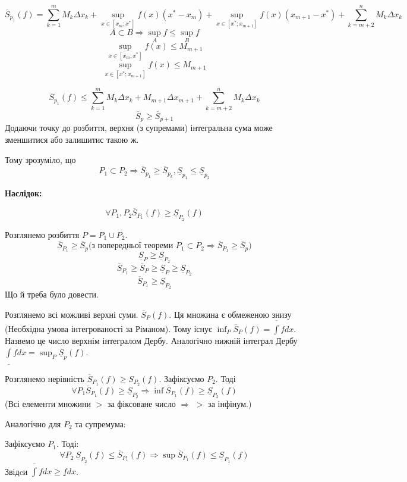 \documentclass[12pt]{report}
\begin{document}
$$\overline S_{p_1}(f) = \sum_{k = 1}^m M_{k} \Delta x_k + \sup_{x \in [x_{m}; x^{*}]} f(x) (x^* - x_m) + \sup_{x \in [x^{*}; x_{m+1}]} f(x) (x_{m+1} - x^*) + \sum_{k = m+2}^n M_k \Delta x_k$$
$$A \subset B \Longrightarrow \sup_{A} f \leq \sup_{B} f$$
$$\sup_{x \in [x_{m}; x^{*}]} f(x) \leq M_{m+1}$$
$$\sup_{x \in [x^{*}; x_{m+1}]} f(x) \leq M_{m+1}$$

$$\overline S_{p_1}(f) \leq \sum_{k = 1}^m M_{k} \Delta x_k + M_{m+1}\Delta x_{m+1} + \sum_{k = m+2}^n M_k \Delta x_k$$
$$\overline S_p \geq \overline S_{p+1}$$
Додаючи точку до розбиття, верхня (з супремами) інтегральна сума може зменшитися або залишитис такою ж.

Тому зрозуміло, що 
$$P_1 \subset P_2 \Longrightarrow \overline S_{p_1} \geq \overline S_{p_k}, \underline S_{p_1} \leq \underline S_{p_2}$$

\textbf{Наслідок:}

$$\forall P_1, P_2 \overline S_{P_1}(f) \geq \underline S_{P_2}(f)$$ 

Розглянемо розбиття $P = P_1 \cup P_2$.
$$\overline S_{P_1} \geq \overline S_{p} \textrm{(з попередньої теореми $P_1 \subset P_2 \Longrightarrow \overline S_{P_1} \geq \overline S_{p}$)}$$
$$\underline S_{P} \geq \underline S_{P_2}$$
$$\overline S_{P_1} \geq \overline S_{P} \geq \underline S_{P} \geq \underline S_{P_2}$$
$$\overline S_{P_1} \geq \underline S_{P_2}$$
Що й треба було довести.

\vspace{3mm}

Розглянемо всі можливі верхні суми. $\overline S_{P} (f)$. Ця множина є обмеженою знизу (Необхідна умова інтегрованості за Ріманом). 
Тому існує $\inf_{P} \overline S_{P} (f) = \overline \int f dx$. Назвемо це число верхнім інтегралом Дербу. Аналогічно 
нижній інтеграл Дербу $\underline \int f dx = \sup_{P} \underline S_{p} (f)$.

\vspace{3mm}

Розглянемо нерівність $\overline S_{P_1} (f) \geq S_{P_2} (f)$. 
Зафіксуємо $P_2$. Тоді 
$$\forall P_1 \overline S_{P_1} (f) \geq \underline S_{P_2} \Longrightarrow \inf \overline S_{P_1} (f) \geq \underline S_{P_2} (f)$$
(Всі елементи множини $>$ за фіксоване число $\Longrightarrow$ $>$ за інфінум.)

Аналогічно для $P_2$ та супремума:

Зафіксуємо $P_1$. Тоді:
$$\forall P_2 \ \underline S_{P_2} (f) \leq \overline S_{P_1} (f) \Longrightarrow \sup \overline S_{P_1} (f) \leq \underline S_{P_1} (f)$$
Звідcи $\overline \int fdx \geq \underline f dx$.
\end{document}
